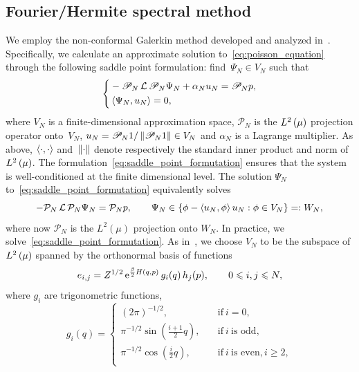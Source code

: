 \documentclass[11pt,a4paper]{article}
\begin{document}
\subsection{Fourier/Hermite spectral method}%
\label{sub:galerkin_approach}
We employ the non-conformal Galerkin method developed and analyzed in~\cite{roussel2018spectral}.
Specifically, we calculate an approximate solution to~\eqref{eq:poisson_equation} through the following saddle point formulation:
find~$\Psi_N \in V_N$ such that
\begin{align}
  \label{eq:saddle_point_formutation}
  \left\{
    \begin{aligned}
       & - \mathscr P_N \, \mathcal L \, \mathscr P_N \Psi_N + \alpha_N u_N = \mathscr P_N p, \\
       & \ip{\Psi_N}{u_N} = 0,
    \end{aligned}
  \right.
\end{align}
where $V_N$ is a finite-dimensional approximation space,
$\mathscr P_N$ is the $\lp{2}{\mu}$ projection operator onto~$V_N$,
$u_N = \mathscr P_N 1 / \norm{\mathscr P_N 1} \in V_N$
and $\alpha_N$ is a Lagrange multiplier.
As above,
$\ip{\cdot}{\cdot}$ and~$\norm{\cdot}$ denote respectively the standard inner product and norm of $\lp{2}{\mu}$.
The formulation~\eqref{eq:saddle_point_formutation} ensures
that the system is well-conditioned at the finite dimensional level.
The solution $\Psi_N$ to~\eqref{eq:saddle_point_formutation} equivalently solves
\[
    - \mathcal P_N \, \mathcal L \, \mathcal P_N \Psi_N = \mathcal P_N p, \qquad \Psi_N \in \{\phi - \ip{u_N}{\phi} u_N : \phi \in V_N\} =: W_N,
\]
where now $\mathcal P_N$ is the $L^2(\mu)$ projection onto $W_N$.
In practice, we solve~\eqref{eq:saddle_point_formutation}.
As in~\cite{roussel2018spectral},
we choose $V_N$ to be the subspace of $\lp{2}{\mu}$ spanned by the orthonormal basis of functions
\begin{equation}
  \label{eq:basis_functions}
  e_{i,j} = Z^{1/2} \, \mathrm{e}^{\frac{\beta}{2} H(q,p)}
  \, g_i(q) \, h_j(p), \qquad 0 \leqslant i,j \leqslant N,
\end{equation}
where $g_i$ are trigonometric functions,
\begin{equation}
  \label{eq:definition_trigonometric_functions}
  g_i(q) =
  \left\{ \begin{aligned}
    (2 \pi)^{-1/2}, \quad & \text{if}~i = 0, \\
    \pi^{-1/2} \sin\left(\frac{i + 1}{2}q\right), \quad & \text{if}~i~\text{is odd}, \\
    \pi^{-1/2} \cos\left(\frac{i}{2}q\right), \quad & \text{if}~i~\text{is even}, i \geq 2, \\
  \end{aligned} \right.
\end{equation}
\end{document}
